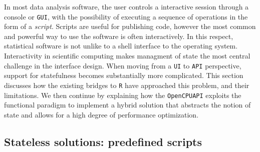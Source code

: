 \documentclass{article}
\newcommand{\R}{\texttt{R}\xspace}
\newcommand{\HTTP}{\texttt{HTTP}\xspace}
\newcommand{\TCP}{\texttt{TCP}\xspace}
\newcommand{\IP}{\texttt{IP}\xspace}
\newcommand{\GUI}{\texttt{GUI}\xspace}
\newcommand{\UI}{\texttt{UI}\xspace}
\newcommand{\API}{\texttt{API}\xspace}
\newcommand{\OpenCPU}{\texttt{OpenCPU}\xspace}
\begin{document}

In most data analysis software, the user controls a interactive session through a console or \GUI, with the possibility of executing a sequence of operations in the form of a \emph{script}. Scripts are useful for publishing code, however the most common and powerful way to use the software is often interactively. In this respect, statistical software is not unlike to a shell interface to the operating system. Interactivity in scientific computing makes managment of state the most central challenge in the interface design. When moving from a \UI to \API perspective, support for statefulness becomes substantially more complicated. This section discusses how the existing bridges to \R have approached this problem, and their limitations. We then continue by explaining how the \OpenCPU \API exploits the functional paradigm to implement a hybrid solution that abstracts the notion of state and allows for a high degree of performance optimization.

\subsection{Stateless solutions: predefined scripts}
\end{document}
